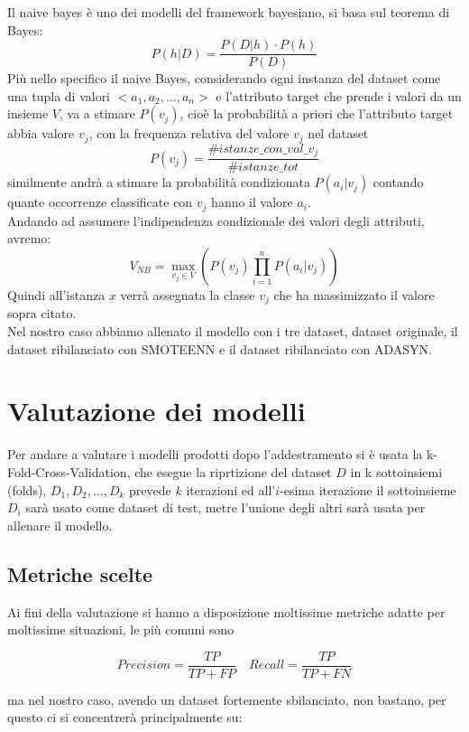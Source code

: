 \documentclass[italian,12pt,a4paper]{article}
\begin{document}
	Il naive bayes è uno dei modelli del framework bayesiano, si basa sul teorema di Bayes:
	$$P(h|D) = \frac{P(D|h)\cdot P(h)}{P(D)}$$
	Più nello specifico il naive Bayes, considerando ogni instanza del dataset come una tupla di valori $<a_1, a_2, \dots, a_n>$ e l'attributo target che prende i valori da un insieme $V$, va a stimare $P(v_j)$, cioè la probabilità a priori che l'attributo target abbia valore $v_j$, con la frequenza relativa del valore $v_j$ nel dataset $$P(v_j) = \frac{\#istanze\_con\_val\_v_j}{\#istanze\_tot}$$ similmente andrà a stimare la probabilità condizionata $P(a_i|v_j)$ contando quante occorrenze classificate con $v_j$ hanno il valore $a_i$. \\
	Andando ad assumere l'indipendenza condizionale dei valori degli attributi, avremo:
	$$V_{NB} = \max_{v_j \in V}(P(v_j)\prod_{i = 1}^{n} P(a_i|v_j))$$
	Quindi all'istanza $x$ verrà assegnata la classe $v_j$ che ha massimizzato il valore sopra citato. \\
	Nel nostro caso abbiamo allenato il modello con i tre dataset, dataset originale, il dataset ribilanciato con SMOTEENN e il dataset ribilanciato con ADASYN.
	
	\section{Valutazione dei modelli}
	Per andare a valutare i modelli prodotti dopo l'addestramento si è usata la k-Fold-Cross-Validation, che esegue la riprtizione del dataset $D$ in k sottoinsiemi (folds), $D_1, D_2, \dots, D_k$ prevede $k$ iterazioni ed all'$i$-esima iterazione il sottoinsieme $D_i$ sarà usato come dataset di test, metre l'unione degli altri sarà usata per allenare il modello.
	
	\subsection{Metriche scelte}
	Ai fini della valutazione si hanno a disposizione moltissime metriche adatte per moltissime situazioni, le più comuni sono
	
	$$Precision = \frac{TP}{TP+FP} \quad Recall = \frac{TP}{TP+FN}$$
	
	ma nel nostro caso, avendo un dataset fortemente sbilanciato, non bastano, per questo ci si concentrerà principalmente su:
	
\end{document}

